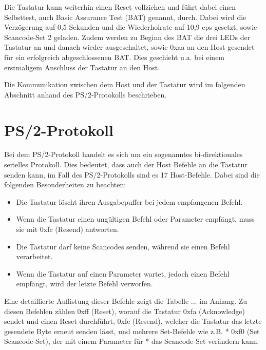 Die Tastatur kann weiterhin einen Reset vollziehen und führt dabei einen Selbsttest, auch Basic Assurance Test (BAT) genannt, durch. Dabei wird die Verzögerung auf 0,5 Sekunden und die Wiederholrate auf 10,9 cps gesetzt, sowie Scancode-Set 2 geladen. Zudem werden zu Beginn des BAT die drei LEDs der Tastatur an und danach wieder ausgeschaltet, sowie 0xaa an den Host gesendet für ein erfolgreich abgeschlossenen BAT. Dies geschieht u.a. bei einem erstmaligem Anschluss der Tastatur an den Host.

Die Kommunikation zwischen dem Host und der Tastatur wird im folgenden Abschnitt anhand des PS/2-Protokolls beschrieben.



\section{PS/2-Protokoll}
Bei dem PS/2-Protokoll handelt es sich um ein sogenanntes bi-direktionales serielles Protokoll. Dies bedeutet, dass auch der Host Befehle an die Tastatur senden kann, im Fall des PS/2-Protokolls sind es 17 Host-Befehle. Dabei sind die folgenden Besonderheiten zu beachten:
\begin{itemize}
  \item Die Tastatur löscht ihren Ausgabepuffer bei jedem empfangenen Befehl.
  \item Wenn die Tastatur einen ungültigen Befehl oder Parameter empfängt, muss sie mit 0xfe (Resend) antworten.
  \item Die Tastatur darf keine Scancodes senden, während sie einen Befehl verarbeitet.
  \item Wenn die Tastatur auf einen Parameter wartet, jedoch einen Befehl empfängt, wird der letzte Befehl verworfen.
\end{itemize}
Eine detaillierte Auflistung dieser Befehle zeigt die Tabelle ... im Anhang. Zu diesen Befehlen zählen 0xff (Reset), worauf die Tastatur 0xfa (Acknowledge) sendet und einen Reset durchführt, 0xfe (Resend), welcher die Tastatur das letzte gesendete Byte erneut senden lässt, und mehrere Set-Befehle wie z.B. * 0xf0 (Set Scancode-Set), der mit einem Parameter für * das Scancode-Set verändern kann.

